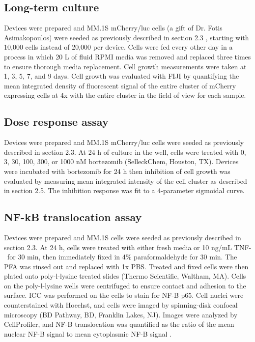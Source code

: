 \subsection{Long-term culture}
Devices were prepared and MM.1S mCherry/luc cells (a gift of Dr. Fotis Asimakopoulos) were seeded as previously described in section 2.3 , starting with 10,000 cells instead of 20,000 per device. Cells were fed every other day in a process in which 20 \textmu L of fluid RPMI media was removed and replaced three times to ensure thorough media replacement. Cell growth measurements were taken at 1, 3, 5, 7, and 9 days. Cell growth was evaluated with FIJI by quantifying the mean integrated density of fluorescent signal of the entire cluster of mCherry expressing cells at 4x with the entire cluster in the field of view for each sample. 
 

\subsection{Dose response assay}
 Devices were prepared and MM.1S mCherry/luc cells were seeded as previously described in section 2.3. At 24 h of culture in the well, cells were treated with 0, 3, 30, 100, 300, or 1000 nM bortezomib (SelleckChem, Houston, TX). Devices were incubated with bortezomib for 24 h then inhibition of cell growth was evaluated by measuring mean integrated intensity of the cell cluster as described in section 2.5. The inhibition response was fit to a 4-parameter sigmoidal curve.


\subsection{NF-kB translocation assay}
Devices were prepared and MM.1S cells were seeded as previously described in section 2.3. At 24 h, cells were treated with either fresh media or 10 ng/mL TNF-\textalpha \ for 30 min, then immediately fixed in 4\% paraformaldehyde for 30 min. The PFA was rinsed out and replaced with 1x PBS. Treated and fixed cells were then plated onto poly-l-lysine treated slides (Thermo Scientific, Waltham, MA). Cells on the poly-l-lysine wells were centrifuged to ensure contact and adhesion to the surface. ICC was performed on the cells to stain for NF-\textkappa B p65. Cell nuclei were counterstained with Hoechst, and cells were imaged by spinning-disk confocal microscopy (BD Pathway, BD, Franklin Lakes, NJ). Images were analyzed by CellProfiler, and NF-\textkappa B translocation was quantified as the ratio of the mean nuclear NF-\textkappa B signal to mean cytoplasmic NF-\textkappa B signal \cite{Kasper2010}. 


